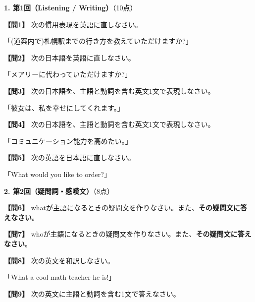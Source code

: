 \noindent\textbf{1. 第1回（Listening / Writing）}（10点）

\testquestion
\noindent\textbf{【問1】} 次の慣用表現を英語に直しなさい。

\noindent「(道案内で)札幌駅までの行き方を教えていただけますか?」

\testqsep
\testquestion
\noindent\textbf{【問2】} 次の日本語を英語に直しなさい。

\noindent「メアリーに代わっていただけますか?」

\testqsep
\testquestion
\noindent\textbf{【問3】} 次の日本語を、主語と動詞を含む英文1文で表現しなさい。

\noindent「彼女は、私を幸せにしてくれます。」

\testqsep
\testquestion
\noindent\textbf{【問4】} 次の日本語を、主語と動詞を含む英文1文で表現しなさい。

\noindent「コミュニケーション能力を高めたい。」

\testqsep
\testquestion
\noindent\textbf{【問5】} 次の英語を日本語に直しなさい。

\noindent「What would you like to order?」

\testqsep
\newpage

\noindent\textbf{2. 第2回（疑問詞・感嘆文）}（8点）

\testquestion
\noindent\textbf{【問6】} whatが主語になるときの疑問文を作りなさい。また、\textbf{その疑問文に答えなさい}。

\vspace{0.5em}
\testqsep
\testquestion
\noindent\textbf{【問7】} whoが主語になるときの疑問文を作りなさい。また、\textbf{その疑問文に答えなさい}。

\vspace{0.5em}
\testqsep
\testquestion
\noindent\textbf{【問8】} 次の英文を和訳しなさい。

\noindent「What a cool math teacher he is!」

\testqsep
\testquestion
\noindent\textbf{【問9】} 次の英文に主語と動詞を含む1文で答えなさい。

